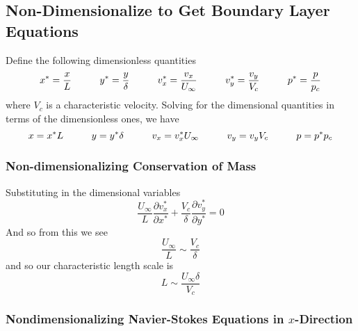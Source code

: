 \subsection{Non-Dimensionalize to Get Boundary Layer Equations}

Define the following dimensionless quantities
\begin{equation*}
  x^{*}=\frac{x}{L}
  \hspace{0.4in}
  y^{*}=\frac{y}{\delta}
  \hspace{0.4in}
  v_{x}^{*}=\frac{v_{x}}{U_{\infty}}
  \hspace{0.4in}
  v_{y}^{*}=\frac{v_{y}}{V_{c}}
  \hspace{0.4in}
  p^{*}=\frac{p}{p_{c}}
\end{equation*}
where $V_{c}$ is a characteristic velocity.
Solving for the dimensional quantities in terms of the dimensionless ones, we have
\begin{equation*}
  x=x^{*}L
  \hspace{0.4in}
  y=y^{*}\delta
  \hspace{0.4in}
  v_{x}=v_{x}^{*}U_{\infty}
  \hspace{0.4in}
  v_{y}=v_{y}V_{c}
  \hspace{0.4in}
  p=p^{*}p_{c}
\end{equation*}

\subsubsection{Non-dimensionalizing Conservation of Mass}

Substituting in the dimensional variables
\begin{equation*}
  \frac{U_{\infty}}{L}\frac{\partial{}v_{x}^{*}}{\partial{}x^{*}}+\frac{V_{c}}{\delta}\frac{\partial{}v_{y}^{*}}{\partial{}y^{*}}=0
\end{equation*}
And so from this we see
\begin{equation*}
  \frac{U_{\infty}}{L}\sim\frac{V_{c}}{\delta}
\end{equation*}
and so our characteristic length scale is
\begin{equation*}
  L\sim\frac{U_{\infty}\delta}{V_{c}}
\end{equation*}

\subsubsection{Nondimensionalizing Navier-Stokes Equations in $x$-Direction}

